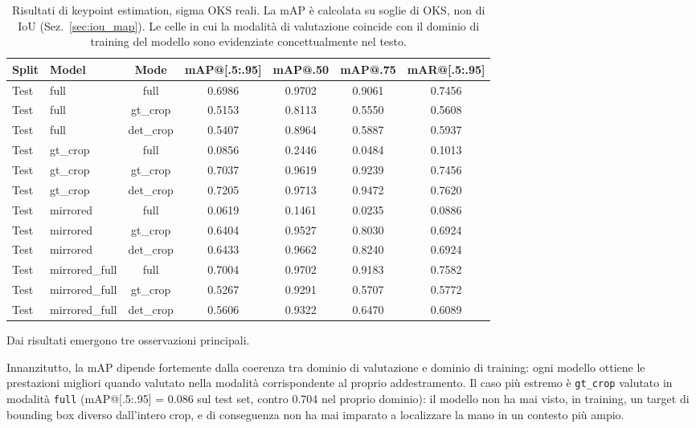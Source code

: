 \begin{table}[htbp]
\centering
\caption{Risultati di keypoint estimation, sigma OKS reali. La mAP è calcolata su soglie di OKS, non di IoU (Sez.~\ref{sec:iou_map}). Le celle in cui la modalità di valutazione coincide con il dominio di training del modello sono evidenziate concettualmente nel testo.}
\label{tab:risultati_keypoint_completo}
\smallskip
\small
\begin{tabular}{llccccc}
\toprule
Split & Model & Mode & mAP@[.5:.95] & mAP@.50 & mAP@.75 & mAR@[.5:.95] \\
\midrule
Test & full & full & 0.6986 & 0.9702 & 0.9061 & 0.7456 \\
Test & full & gt\_crop & 0.5153 & 0.8113 & 0.5550 & 0.5608 \\
Test & full & det\_crop & 0.5407 & 0.8964 & 0.5887 & 0.5937 \\
Test & gt\_crop & full & 0.0856 & 0.2446 & 0.0484 & 0.1013 \\
Test & gt\_crop & gt\_crop & 0.7037 & 0.9619 & 0.9239 & 0.7456 \\
Test & gt\_crop & det\_crop & 0.7205 & 0.9713 & 0.9472 & 0.7620 \\
Test & mirrored & full & 0.0619 & 0.1461 & 0.0235 & 0.0886 \\
Test & mirrored & gt\_crop & 0.6404 & 0.9527 & 0.8030 & 0.6924 \\
Test & mirrored & det\_crop & 0.6433 & 0.9662 & 0.8240 & 0.6924 \\
Test & mirrored\_full & full & 0.7004 & 0.9702 & 0.9183 & 0.7582 \\
Test & mirrored\_full & gt\_crop & 0.5267 & 0.9291 & 0.5707 & 0.5772 \\
Test & mirrored\_full & det\_crop & 0.5606 & 0.9322 & 0.6470 & 0.6089 \\
\bottomrule
\end{tabular}
\end{table}

Dai risultati emergono tre osservazioni principali.

Innanzitutto, la mAP dipende fortemente dalla coerenza tra dominio di
valutazione e dominio di training: ogni modello ottiene le prestazioni
migliori quando valutato nella modalità corrispondente al proprio
addestramento. Il caso più estremo è \texttt{gt\_crop} valutato in
modalità \texttt{full} (mAP@[.5:.95] = 0.086 sul test set, contro 0.704
nel proprio dominio): il modello non ha mai visto, in training, un
target di bounding box diverso dall'intero crop, e di conseguenza non
ha mai imparato a localizzare la mano in un contesto più ampio.

